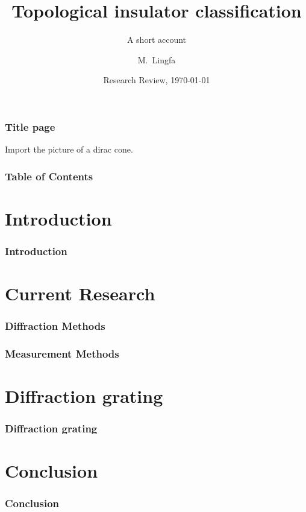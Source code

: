 \documentclass{beamer}
\title[Topological Insulators] %
{Topological insulator classification}
\subtitle{A short account}
\author[] %
{
M.~Lingfa\inst{1} \inst{2}}
\institute[CU] %
{
	\inst{1}%
	the Cavendish Laboratory
	\and
	\inst{2}%
	Gonville and Caius College\\
	University of Cambridge
}
\date[Part II 2020] %
{Research Review, \today}
\begin{document}
	\frame{\titlepage}
	\begin{frame}
	\frametitle{Title page}
	Import the picture of a dirac cone.
	\end{frame}

	\begin{frame}
	\frametitle{Table of Contents}
	\tableofcontents
	\end{frame}
	
	\section{Introduction}
	
	\begin{frame}
	\frametitle{Introduction}
	\end{frame}
	
	
	\section{Current Research}
	
	\begin{frame}
	\frametitle{Diffraction Methods}
	
	\end{frame}

	\begin{frame}
	\frametitle{Measurement Methods}
	
	\end{frame}
	
	\section{}
	
	
	\section{Diffraction grating}
	\begin{frame} 
	\frametitle{Diffraction grating}
	\end{frame}
	    
	
	
	\section{Conclusion}
	
	\begin{frame}
	\frametitle{Conclusion}
	\end{frame}
	
\end{document}
